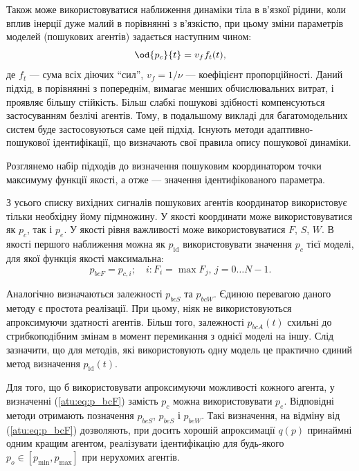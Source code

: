 \documentclass[a4paper,13pt]{atuaref}
\begin{document}
Також може використовуватися наближення динаміки тіла в в'язкої рідини, коли
вплив інерції дуже малий в порівнянні з в'язкістю, при цьому зміни параметрів
моделей (пошукових агентів) задається наступним чином:
%
\begin{equation}
  \od{p_c}{t} = v_f f_t(t),
  \label{atu:eq:v_f}
\end{equation}
%
\noindent
де $ f_t $ --- сума всіх діючих ``сил'',
$ v_f = 1 / \nu $ --- коефіцієнт
пропорційності. Даний підхід, в порівнянні з попереднім, вимагає менших
обчислювальних витрат, і проявляє більшу стійкість. Більш слабкі пошукові
здібності компенсуються застосуванням безлічі агентів. Тому, в подальшому
викладі для багатомодельних систем буде застосовуються саме цей підхід.
Існують методи адаптивно-пошукової ідентифікації, що визначають свої правила опису пошукової динаміки.


Розглянемо набір підходів до визначення пошуковим координатором точки максимуму
функції якості, а отже --- значення ідентифікованого параметра.

З усього списку вихідних сигналів пошукових агентів координатор використовує
тільки необхідну йому підмножину. У якості координати може використовуватися як
$ p_c$, так і $ p_e $.
У якості рівня важливості може використовуватися $ F $, $ S $, $W$.
В якості першого наближення можна як $ p_\mathrm{id} $ використовувати
значення $ p_c $ тієї моделі, для якої функція якості максимальна:
%
\begin{equation}
  p_{bcF}
  =
  p_{c,i};
  \quad
  i : F_i = \max{F_j}, \, j=0 \ldots N-1 .
  \label{atu:eq:p_bcF}
\end{equation}

Аналогічно визначаються залежності
$p_{bcS}$ та $p_{bcW}$.
Єдиною перевагою даного методу є простота реалізації. При цьому, ніяк не
використовуються апроксимуючи здатності агентів. Більш того, залежності
$ p_{bcA} (t) $ схильні до стрибкоподібним змінам в момент перемикання з однієї моделі
на іншу. Слід зазначити, що для методів, які використовують одну модель це
практично єдиний метод визначення
$p_\mathrm{id}(t)$.

Для того, що б використовувати апроксимуючи можливості кожного агента, у
визначенні (\ref{atu:eq:p_bcF}) замість $ p_c $ можна використовувати $ p_e$.
Відповідні методи отримають позначення $ p_ {beS} $, $ p_ {beS} $ і $ p_{beW} $.
Такі визначення, на відміну від (\ref{atu:eq:p_bcF}) дозволяють,
при досить хорошій апроксимації $ q (p) $ принаймні одним кращим агентом,
реалізувати ідентифікацію для будь-якого
$ p_o \in [p_{\min} , p_{\max}]$ при нерухомих агентів.
\end{document}
